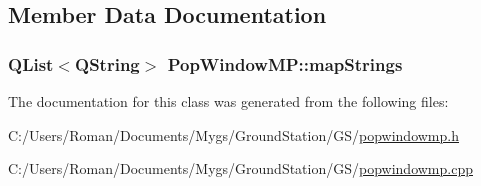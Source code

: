 \subsection{Member Data Documentation}
\hypertarget{class_pop_window_m_p_a95b9fb0c455dce6924a1a7282fd13b00}{}
\subsubsection[{map\+Strings}]{\setlength{\rightskip}{0pt plus 5cm}Q\+List$<$Q\+String$>$ Pop\+Window\+M\+P\+::map\+Strings}\label{class_pop_window_m_p_a95b9fb0c455dce6924a1a7282fd13b00}


The documentation for this class was generated from the following files\+:\begin{DoxyCompactItemize}
\item 
C\+:/\+Users/\+Roman/\+Documents/\+Mygs/\+Ground\+Station/\+G\+S/\hyperlink{popwindowmp_8h}{popwindowmp.\+h}\item 
C\+:/\+Users/\+Roman/\+Documents/\+Mygs/\+Ground\+Station/\+G\+S/\hyperlink{popwindowmp_8cpp}{popwindowmp.\+cpp}\end{DoxyCompactItemize}
